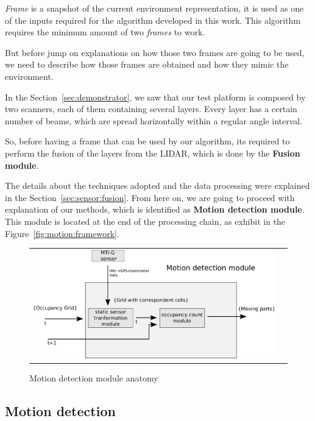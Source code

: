 \textit{Frame} is a snapshot of the current environment representation, it is used as one of the inputs required for the algorithm developed in this work. This algorithm requires the minimum amount of two \textit{frames} to work. 

But before jump on explanations on how those two frames are going to be used, we need to describe how those frames are obtained and how they mimic the environment.

In the Section~\ref{sec:demonstrator}, we saw that our test platform is composed by two scanners, each of them containing several layers. Every layer has a certain number of beams, which are spread horizontally within a regular angle interval. 

So, before having a frame that can be used by our algorithm, its required to perform the fusion of the layers from the LIDAR, which is done by the \textbf{Fusion module}. 

The details about the techniques adopted and the data processing were explained in the Section~\ref{sec:sensor:fusion}. From here on, we are going to proceed with explanation of our methods, which is identified as \textbf{Motion detection module}. This module is located at the end of the processing chain, as exhibit in the Figure~\ref{fig:motion:framework}. 

\begin{figure}[h]
   \centering
     \begin{tabular}{lr}
       \includegraphics[scale=0.50]{img/fig:motion:framework:motionmodule}
     \end{tabular}
   \caption{Motion detection module anatomy}
   \label{fig:motion:framework:motionmodule}
\end{figure}


\subsection{Motion detection}

